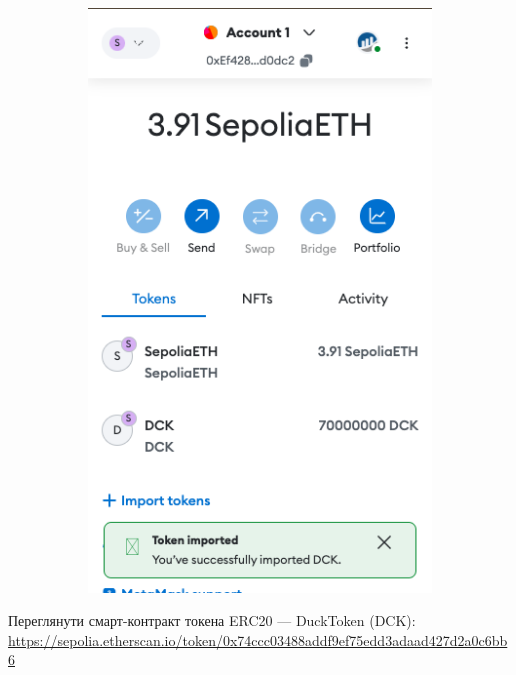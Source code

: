 \begin{figure}[ht!]
\begin{subfigure}{0.25\textwidth}
             \includegraphics[width=\textwidth]{IMAGES/metamask04.png}
            \label{fig_vsc}
        \end{subfigure}
    \end{figure}

Переглянути смарт-контракт токена ERC20 --- DuckToken (DCK): \url{https://sepolia.etherscan.io/token/0x74ccc03488addf9ef75edd3adaad427d2a0c6bb6}


